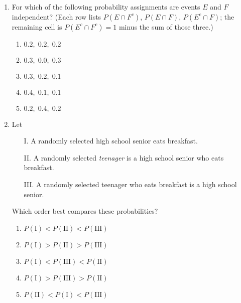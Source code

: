 \documentclass{article}
\begin{document}
\begin{enumerate}[label=\textbf{S\arabic*.}]
\item For which of the following probability assignments are events $E$ and $F$
independent? (Each row lists $P(E\cap F^{c})$, $P(E\cap F)$, $P(E^{c}\cap F)$;
the remaining cell is $P(E^{c}\cap F^{c})=1$ minus the sum of those three.)
\begin{enumerate}
  \item $0.2,\;0.2,\;0.2$
  \item $0.3,\;0.0,\;0.3$
  \item $0.3,\;0.2,\;0.1$
  \item $0.4,\;0.1,\;0.1$
  \item $0.2,\;0.4,\;0.2$
\end{enumerate}

\item Let
\begin{itemize}
  \item[I.] A randomly selected high school senior eats breakfast.
  \item[II.] A randomly selected \emph{teenager} is a high school senior who eats breakfast.
  \item[III.] A randomly selected teenager who eats breakfast is a high school senior.
\end{itemize}
Which order best compares these probabilities?
\begin{enumerate}
  \item $P(\text{I})<P(\text{II})<P(\text{III})$
  \item $P(\text{I})>P(\text{II})>P(\text{III})$
  \item $P(\text{I})<P(\text{III})<P(\text{II})$
  \item $P(\text{I})>P(\text{III})>P(\text{II})$
  \item $P(\text{II})<P(\text{I})<P(\text{III})$
\end{enumerate}

\end{enumerate}
\end{document}
